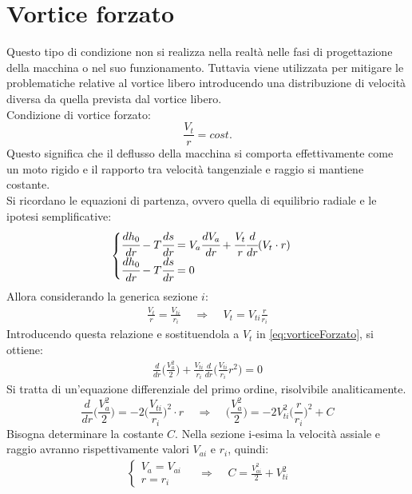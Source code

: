 \section{Vortice forzato}
Questo tipo di condizione non si realizza nella realtà nelle fasi di progettazione della macchina o nel suo funzionamento. Tuttavia viene utilizzata per mitigare le problematiche relative al vortice libero introducendo una distribuzione di velocità diversa da quella prevista dal vortice libero.\\
Condizione di vortice forzato:
\begin{equation}
\boxed{\frac{V_t}{r} = cost.}
\label{eq:VortForz}
\end{equation}
Questo significa che il deflusso della macchina si comporta effettivamente come un moto rigido e il rapporto tra velocità tangenziale e raggio si mantiene costante.\\
Si ricordano le equazioni di partenza, ovvero quella di equilibrio radiale e le ipotesi semplificative:
\begin{equation}
\begin{cases}
\cfrac{dh_0}{dr} - T\cfrac{ds}{dr} = V_a \cfrac{dV_a}{dr} + \cfrac{V_t}{r} \cfrac{d}{dr}(V_t \cdot r)\\
\cfrac{dh_0}{dr} - T\cfrac{ds}{dr} = 0
\end{cases}
\label{eq:vorticeForzato}
\end{equation}
Allora considerando la generica sezione $i$:
\begin{align*}
\frac{V_t}{r} = \frac{V_{ti}}{r_i} \;\;\;\; \Rightarrow \;\;\;\; V_t = V_{ti} \frac{r}{r_i}
\end{align*}
Introducendo questa relazione e sostituendola a $V_{t}$ in \ref{eq:vorticeForzato}, si ottiene:
\begin{align*}
\frac{d}{dr}\bigg( \frac{V_a^2}{2} \bigg) + \frac{V_{ti}}{r_i} \frac{d}{dr} \bigg(\frac{V_{ti}}{r_i} r^2 \bigg) = 0
\end{align*}
Si tratta di un'equazione differenziale del primo ordine, risolvibile analiticamente.
\begin{equation}
\frac{d}{dr} \bigg( \frac{V_a^2}{2} \bigg) = -2 \bigg( \frac{V_{ti}}{r_i} \bigg) ^2 \cdot r
\;\;\;\; \Rightarrow \;\;\;\; 
\bigg( \frac{V_a^2}{2} \bigg) = -2 V_{ti}^2 \bigg(\frac{r}{r_i} \bigg)^2 +C
\label{eq:SolCost}
\end{equation}
Bisogna determinare la costante $C$. Nella sezione i-esima la velocità assiale e raggio avranno rispettivamente valori $V_{ai}$ e $r_i$, quindi:
\begin{align*}
\begin{cases}
V_a=V_{ai}\\
r=r_i
\end{cases}
\;\;\;\; \Rightarrow \;\;\;\;
C = \frac{V_{ai}^2}{2} + V_{ti}^2
\end{align*}
